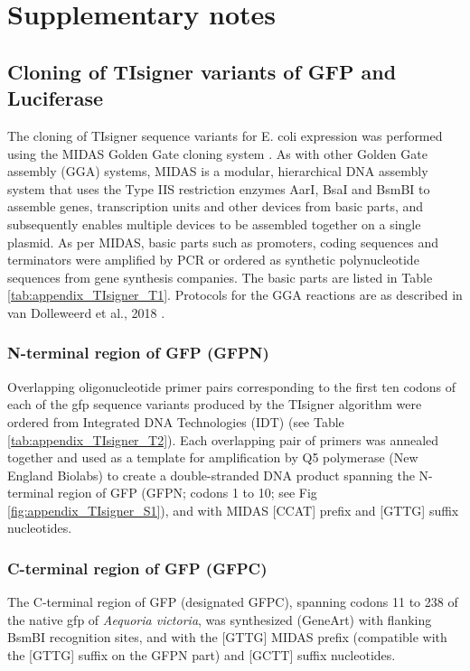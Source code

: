 \section{Supplementary notes}

\subsection{Cloning of TIsigner variants of GFP and Luciferase}
The cloning of TIsigner sequence variants for E. coli expression was performed using the MIDAS Golden Gate cloning system \cite{Van_Dolleweerd2018-sg}. As with other Golden Gate assembly (GGA) systems, MIDAS is a modular, hierarchical DNA assembly system that uses the Type IIS restriction enzymes AarI, BsaI and BsmBI to assemble genes, transcription units and other devices from basic parts, and subsequently enables multiple devices to be assembled together on a single plasmid.
As per MIDAS, basic parts such as promoters, coding sequences and terminators were amplified by PCR or ordered as synthetic polynucleotide sequences from gene synthesis companies. The basic parts are listed in Table \ref{tab:appendix_TIsigner_T1}. Protocols for the GGA reactions are as described in van Dolleweerd et al., 2018 \cite{Van_Dolleweerd2018-sg}.

\subsubsection{N-terminal region of GFP (GFPN)}
Overlapping oligonucleotide primer pairs corresponding to the first ten codons of each of the gfp sequence variants produced by the TIsigner algorithm were ordered from Integrated DNA Technologies (IDT) (see Table \ref{tab:appendix_TIsigner_T2}). Each overlapping pair of primers was annealed together and used as a template for amplification by Q5 polymerase (New England Biolabs) to create a double-stranded DNA product spanning the N-terminal region of GFP (GFPN; codons 1 to 10; see Fig \ref{fig:appendix_TIsigner_S1}), and with MIDAS [CCAT] prefix and [GTTG] suffix nucleotides.

\subsubsection{C-terminal region of GFP (GFPC)}
The C-terminal region of GFP (designated GFPC), spanning codons 11 to 238 of the native gfp of \textit{Aequoria victoria}, was synthesized (GeneArt) with flanking BsmBI recognition sites, and with the [GTTG] MIDAS prefix (compatible with the [GTTG] suffix on the GFPN part) and [GCTT] suffix nucleotides.

